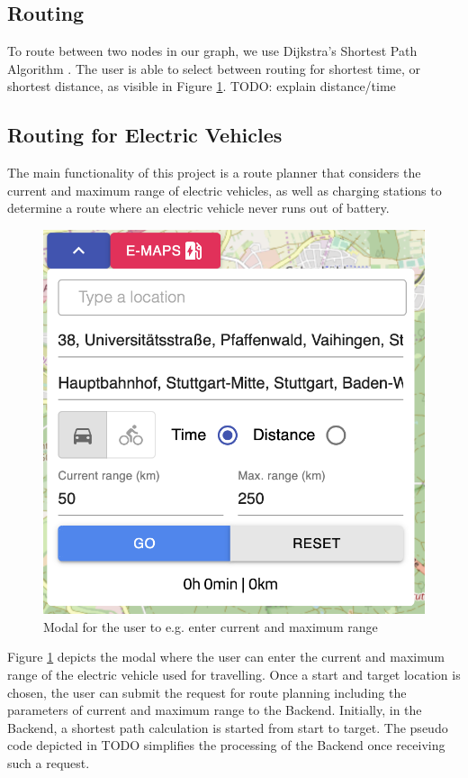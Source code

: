 \documentclass[a4paper]{article}
\begin{document}
\subsection{Routing}
To route between two nodes in our graph, we use Dijkstra's Shortest Path Algorithm \cite{Dijkstra1959}.
The user is able to select between routing for shortest time, or shortest distance, as visible in Figure \ref{fig:input}.
TODO: explain distance/time
\subsection{Routing for Electric Vehicles}
The main functionality of this project is a route planner that considers the current and maximum range of electric vehicles, as well as charging stations to determine a route where an electric vehicle never runs out of battery.
\begin{figure}[h]
    \centering
    \includegraphics[scale=0.3]{figures/input}
    \caption{Modal for the user to e.g. enter current and maximum range}
    \label{fig:input}
\end{figure}
Figure \ref{fig:input} depicts the modal where the user can enter the current and maximum range of the electric vehicle used for travelling.
Once a start and target location is chosen, the user can submit the request for route planning including the parameters of current and maximum range to the Backend.
Initially, in the Backend, a shortest path calculation is started from start to target.
The pseudo code depicted in TODO simplifies the processing of the Backend once receiving such a request.\\
\end{document}
